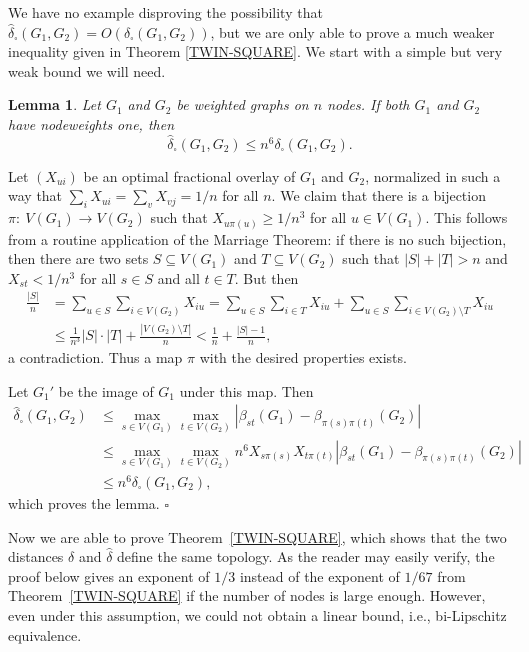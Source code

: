 \documentclass[12pt]{article}
\newtheorem{lemma}[theorem]{Lemma}
\numberwithin{equation}{section}
\newenvironment{proof}{\medskip\noindent{\bf Proof.
}}{\hfill$\square$\medskip}
\def\iv{\widehat}
\begin{document}
We have no example disproving the possibility that
$\iv\delta_\square(G_1,G_2)=O(\delta_\square(G_1,G_2))$, but we are
only able to prove a much weaker inequality given in Theorem
\ref{TWIN-SQUARE}. We start with a simple but very weak bound we
will need.

\begin{lemma}\label{EASY-DELTA}
Let $G_1$ and $G_2$ be weighted graphs on
$n$ nodes.  If both $G_1$ and $G_2$ have
nodeweights one, then
\[
\iv\delta_\square(G_1,G_2)\le n^{{ 6}} \delta_\square(G_1,G_2).
\]
\end{lemma}

\begin{proof}
Let $(X_{ui})$ be an optimal fractional overlay of $G_1$ and $G_2$,
{normalized in such a way that
$\sum_i X_{ui}=\sum_v X_{vj}=1/n$ for all $n$.}
We claim that there is a bijection $\pi:~V(G_1)\to V(G_2)$ such that
$X_{u\pi(u)}\ge 1/n^{{3}}$ for all $u\in V(G_1)$. This follows
from a routine application of the Marriage Theorem: if there is no
such bijection, then there are two sets $S\subseteq V(G_1)$ and
$T\subseteq V(G_2)$ such that $|S|+|T|>n$ and $X_{st}<1/n^{{3}}$
for all $s\in S$
{and all $t\in T$.} But then
\begin{align*}
\frac{|S|}{n}&=\sum_{u\in S}\sum_{i\in V(G_2)} X_{iu} =\sum_{u\in
S}\sum_{i\in T} X_{iu} +\sum_{u\in S}\sum_{i\in V(G_2)\setminus T}
X_{iu}\\ &\le \frac{1}{n^3}|S|\cdot|T| +\frac{|V(G_2)\setminus T|}{n}
< \frac{1}{n}+\frac{|S|-1}{n},
\end{align*}
a contradiction. Thus a map $\pi$ with the desired properties exists.

Let $G_1'$ be the image of $G_1$ under this map.
Then
\begin{align*}
\iv\delta_\square(G_1,G_2)&
\leq\max_{s\in V(G_1)}\max_{t\in  V(G_2)}
|\beta_{st}(G_1)-\beta_{\pi(s)\pi(t)}(G_2)|
\\
&\le \max_{s\in V(G_1)}\max_{t\in  V(G_2)}
n^6X_{s\pi(s)}X_{t\pi(t)}|\beta_{st}(G_1)
-\beta_{\pi(s)\pi(t)}(G_2)|\\
&\le n^6\delta_\square(G_1,G_2),
\end{align*}
which proves the lemma.
\end{proof}

Now we are able to prove Theorem~\ref{TWIN-SQUARE}, which shows that
the two distances $\delta$ and $\iv\delta$ define the same topology.
As the reader may easily verify, the proof below gives an exponent
of $1/3$ instead of the exponent of $1/{67}$ from
Theorem~\ref{TWIN-SQUARE} if the number of nodes is large enough.
However, even under this assumption, we could not obtain a linear
bound, i.e., bi-Lipschitz equivalence.
\end{document}

